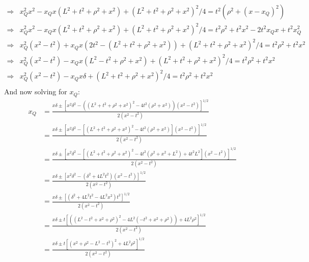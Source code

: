 \documentclass[12pt,a4]{article}
\begin{document}
\begin{enumerate}
\begin{enumerate}
\begin{align*}
          \Rightarrow & x_Q^2x^2 - x_Qx (L^2 + t^2 + \rho^2 + x^2) + (L^2 + t^2 + \rho^2 + x^2)^2/4 = t^2 (\rho^2 + (x - x_Q)^2)\\
          \Rightarrow & x_Q^2x^2 - x_Qx (L^2 + t^2 + \rho^2 + x^2) + (L^2 + t^2 + \rho^2 + x^2)^2/4 = t^2 \rho^2 + t^2 x^2 - 2 t^2x_Qx + t^2x_Q^2\\
          \Rightarrow & x_Q^2(x^2 - t^2) + x_Qx (2t^2 - (L^2 + t^2 + \rho^2 + x^2)) + (L^2 + t^2 + \rho^2 + x^2)^2/4 = t^2 \rho^2 + t^2 x^2 \\
          \Rightarrow & x_Q^2(x^2 - t^2) - x_Qx (L^2 - t^2 + \rho^2 + x^2) + (L^2 + t^2 + \rho^2 + x^2)^2/4 = t^2 \rho^2 + t^2 x^2 \\
          \Rightarrow & x_Q^2(x^2 - t^2) - x_Qx \delta + (L^2 + t^2 + \rho^2 + x^2)^2/4 = t^2 \rho^2 + t^2 x^2 \\
        \end{align*}
        And now solving for $x_Q$:
        \begin{align*}
          x_Q   &= \frac{x\delta \pm \left[x^2\delta^2 - ((L^2 + t^2 + \rho^2 + x^2)^2 - 4 t^2 ( \rho^2 + x^2)) (x^2 - t^2)\right]^{1/2}}{2(x^2 - t^2)}\\
                &= \frac{x\delta \pm \left[x^2\delta^2 - \left[(L^2 + t^2 + \rho^2 + x^2)^2 - 4 t^2 ( \rho^2 + x^2)\right] (x^2 - t^2)\right]^{1/2}}{2(x^2 - t^2)}\\
                &= \frac{x\delta \pm \left[x^2\delta^2 - \left[(L^2 + t^2 + \rho^2 + x^2)^2 - 4 t^2 (\rho^2 + x^2 + L^2) + 4t^2L^2\right] (x^2 - t^2)\right]^{1/2}}{2(x^2 - t^2)}\\
                &= \frac{x\delta \pm \left[x^2\delta^2 - \left(\delta^2 + 4L^2t^2\right) (x^2 - t^2)\right]^{1/2}}{2(x^2 - t^2)}\\
                &= \frac{x\delta \pm \left[\left(\delta^2 + 4L^2t^2 - 4L^2 x^2 \right)t^2 \right]^{1/2}}{2(x^2 - t^2)}\\
                &= \frac{x\delta \pm t\left[\left((L^2 - t^2 + x^2 + \rho^2)^2 - 4L^2(-t^2 + x^2 + \rho^2)\right) + 4L^2 \rho^2 \right]^{1/2}}{2(x^2 - t^2)}\\
                &= \frac{x\delta \pm t\left[(x^2 + \rho^2 - L^2 - t^2) ^2  + 4L^2 \rho^2 \right]^{1/2}}{2(x^2 - t^2)}\\

\end{align*}
\end{enumerate}
\end{enumerate}
\end{document}
